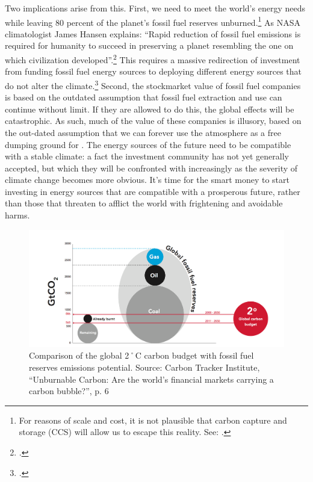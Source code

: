 Two implications arise from this. 
First, we need to meet the world's energy needs while leaving 80 percent of the planet's fossil fuel reserves unburned.\footnote{For reasons of scale and cost, it is not plausible that carbon capture and storage (CCS) will allow us to escape this reality. See: .} 
As NASA climatologist James Hansen explains: ``Rapid reduction of fossil fuel emissions is required for humanity to
succeed in preserving a planet resembling the one on which civilization developed''.\footcite[][]{HansenPaleo}
This requires a massive redirection of investment from funding fossil fuel energy sources to deploying different energy sources that do not alter the climate.\footcite[See: ][]{SternEuropeanLowCarbon}
Second, the stockmarket value of fossil fuel companies is based on the outdated assumption that fossil fuel extraction and use can continue without limit.
If they are allowed to do this, the global effects will be catastrophic.
As such, much of the value of these companies is illusory, based on the out-dated assumption that we can forever use the atmosphere as a free dumping ground for .
The energy sources of the future need to be compatible with a stable climate: a fact the investment community has not yet generally accepted, but which they will be confronted with increasingly as the severity of climate change becomes more obvious.
It's time for the smart money to start investing in energy sources that are compatible with a prosperous future, rather than those that threaten to afflict the world with frightening and avoidable harms.



\begin{figure}
\includegraphics[width=\textwidth]{s1-carbon-budget.png}
\centering
\caption{Comparison of the global 2˚C carbon budget with fossil fuel reserves  emissions potential. Source: Carbon Tracker Institute, ``Unburnable Carbon: Are the world's financial markets carrying a carbon bubble?'', p. 6}
\label{fig:TwoDegreeBudget}
\end{figure}



